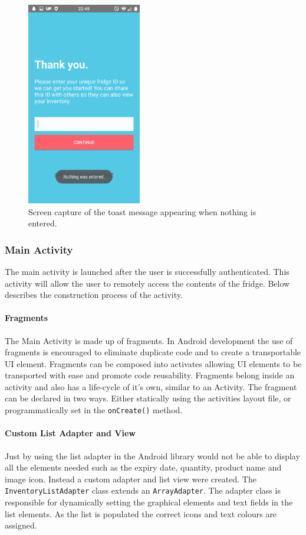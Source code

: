 \documentclass[a4paper, 11pt]{article}
\begin{document}
\vspace{\baselineskip}

\begin{figure}[!htbp]
\centering
\includegraphics[width=5cm]{toast}
\caption{Screen capture of the toast message appearing when nothing is entered.} \label{fig:toast}
\end{figure}

\vspace{\baselineskip}

\subsubsection{Main Activity}
The main activity is launched after the user is successfully authenticated. This activity will allow the user to remotely access the contents of the fridge. Below describes the construction process of the activity. 

\paragraph{Fragments} The Main Activity is made up of fragments. In Android development the use of fragments is encouraged to eliminate duplicate code and to create a transportable UI element. Fragments can be composed into activates allowing UI elements to be transported with ease and promote code reusability. Fragments belong inside an activity and also has a life-cycle of it's own, similar to an Activity. The fragment can be declared in two ways. Either statically using the activities layout file, or programmatically set in the \texttt{onCreate()} method.  	

\paragraph{Custom List Adapter and View} 
Just by using the list adapter in the Android library would not be able to display all the elements needed such as the expiry date, quantity, product name and image icon. Instead a custom adapter and list view were created. The \texttt{InventoryListAdapter} class extends an \texttt{ArrayAdapter}. The adapter class is responsible for dynamically setting the graphical elements and text fields in the list elements. As the list is populated the correct icons and text colours are assigned.
\end{document}
